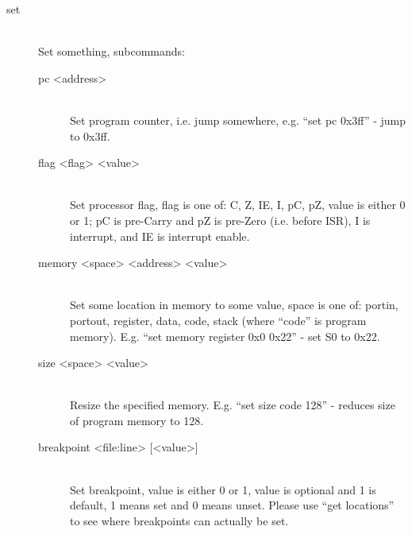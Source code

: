         \begin{description}
            \item[set]~\\
                Set something, subcommands:
                \begin{description}
                    \item[pc <address>]~\\
                        Set program counter, i.e. jump somewhere, e.g. ``set pc 0x3ff'' - jump to 0x3ff.
                    \item[flag <flag> <value>]~\\
                        Set processor flag, flag is one of: {C, Z, IE, I, pC, pZ}, value is either 0 or 1; pC is pre-Carry and pZ is pre-Zero (i.e. before ISR), I is interrupt, and IE is interrupt enable.
                    \item[memory <space> <address> <value>]~\\
                        Set some location in memory to some value, space is one of: { portin, portout, register, data, code, stack} (where ``code'' is program memory). E.g. ``set memory register 0x0 0x22'' - set S0 to 0x22.
                    \item[size <space> <value>]~\\
                        Resize the specified memory. E.g. ``set size code 128'' - reduces size of program memory to 128.
                    \item[breakpoint <file:line> {[}<value>{]}]~\\
                        Set breakpoint, value is either 0 or 1, value is optional and 1 is default, 1 means set and 0 means unset. Please use ``get locations'' to see where breakpoints can actually be set.
                \end{description}


\end{description}
